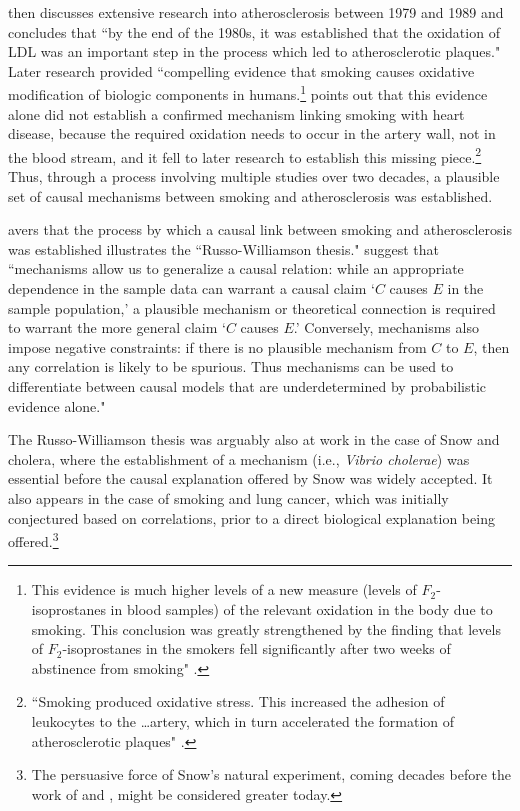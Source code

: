 \documentclass[12pt,reqno,titlepage]{amsart}
\begin{document}
\begin{doublespace}
\citet{Gillies2011-GILTRT-3} then discusses extensive research into atherosclerosis between 1979 and 1989 and concludes that ``by the end of the 1980s, it was established that the oxidation of LDL was an important step in the process which led to atherosclerotic plaques."
Later research provided ``compelling evidence that smoking causes oxidative modification of biologic components in humans.\footnote{This evidence is much higher levels of a new measure (levels of $F_2$-isoprostanes in blood samples) of the relevant oxidation in the body due to smoking.
This conclusion was greatly strengthened by the finding that levels of $F_2$-isoprostanes in the smokers fell significantly after two weeks of abstinence from smoking" \citep[pp.\,1201--2]{Morrow:1995gz}.}
\citet[p.\,120]{Gillies2011-GILTRT-3} points out that this evidence alone did not establish a confirmed mechanism linking smoking with heart disease, because the required oxidation needs to occur in the artery wall, not in the blood stream, and it fell to later research to establish this missing piece.\footnote{
``Smoking produced oxidative stress. 
This increased the adhesion of leukocytes to the \dots artery, which in turn accelerated the formation of atherosclerotic plaques" \citep[p.\,123]{Gillies2011-GILTRT-3}.}
Thus, through a process involving multiple studies over two decades, a plausible set of causal mechanisms between smoking and atherosclerosis was established. 

\citet{Gillies2011-GILTRT-3} avers that the process by which a causal link between smoking and atherosclerosis was established illustrates the ``Russo-Williamson thesis."
 \citet[p.\,159]{Russo:2007iz} suggest that ``mechanisms allow us to generalize a causal relation: while an appropriate dependence in the sample data can warrant a causal claim `$C$ causes $E$ in the sample population,' a plausible mechanism or theoretical connection is required to warrant the more general claim `$C$ causes $E$.' 
Conversely, mechanisms also impose negative constraints: if there is no plausible mechanism from $C$ to $E$, then any correlation is likely to be spurious.
Thus mechanisms can be used to differentiate between causal models that are underdetermined by probabilistic evidence alone."

The Russo-Williamson thesis was arguably also at work in the case of Snow and cholera, where the establishment of a mechanism (i.e., \emph{Vibrio cholerae}) was essential before the causal explanation offered by Snow was widely accepted.
It also appears in the case of smoking and lung cancer, which was initially conjectured based on correlations, prior to a direct biological explanation being offered.\footnote{
The persuasive force of Snow's natural experiment, coming decades before the work of \citet{Neyman:1923aa} and \citet{Fisher:1935aa}, might be considered greater today.}


\end{doublespace}
\end{document}
